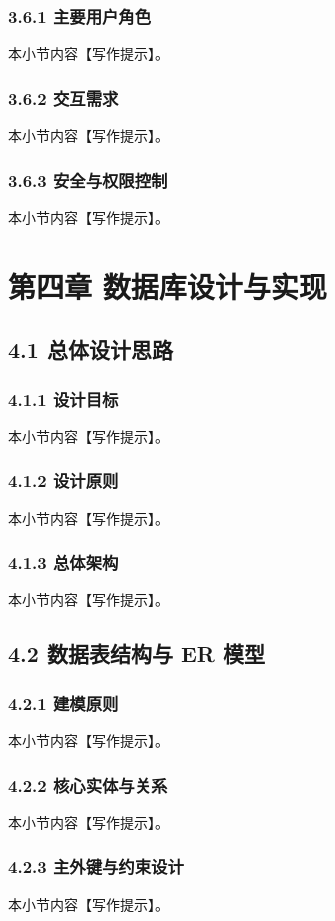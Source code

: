 \subsection{3.6.1 主要用户角色}
本小节内容【写作提示】。\cite{DefenseAdvancement_Ship_UAS_2025,anyaegbu_2008_nav_pulsed_mitigation}
\subsection{3.6.2 交互需求}
本小节内容【写作提示】。\cite{reid_2018_nav_leo}
\subsection{3.6.3 安全与权限控制}
本小节内容【写作提示】。\cite{huo_2015_electronics_letters_noise_est}

\chapter{第四章 数据库设计与实现}
\section{4.1 总体设计思路}
\subsection{4.1.1 设计目标}
本小节内容【写作提示】。
\subsection{4.1.2 设计原则}
本小节内容【写作提示】。
\subsection{4.1.3 总体架构}
本小节内容【写作提示】。
\section{4.2 数据表结构与 ER 模型}
\subsection{4.2.1 建模原则}
本小节内容【写作提示】。
\subsection{4.2.2 核心实体与关系}
本小节内容【写作提示】。
\subsection{4.2.3 主外键与约束设计}
本小节内容【写作提示】。
